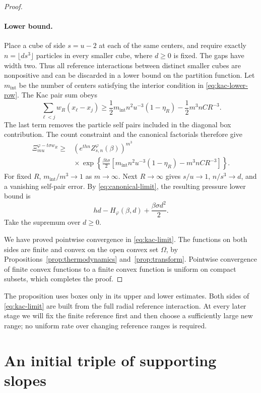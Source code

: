 \begin{proof}
\paragraph{Lower bound.}
Place a cube of side \(s=u-2\) at each of the same centers, and require
exactly \(n=\lfloor ds^3\rfloor\) particles in every smaller cube,
where \(d\ge0\) is fixed.  The gaps have width two.  Thus all reference
interactions between distinct smaller cubes are nonpositive and can be
discarded in a lower bound on the partition function.
Let \(m_{\mathrm{int}}\) be the number of centers satisfying the
interior condition in \eqref{eq:kac-lower-row}.  The Kac pair sum obeys
\[
 \sum_{\ell<j}w_R(x_\ell-x_j)
 \ge \frac12m_{\mathrm{int}}n^2u^{-3}(1-\eta_R)
                      -\frac12m^3nCR^{-3}.
\]
The last term removes the particle self pairs included in the diagonal
box contribution.  The count constraint and the canonical factorials
therefore give
\begin{align*}
 \Xi_{mu}^{\varphi-t\sigma w_R}
 \ge{}&
 \left(e^{thn}Z_{s,n}^{\varphi}(\beta)\right)^{m^3}\\
 &{}\times
 \exp\!\left\{\frac{\beta t\sigma}{2}
 \left[m_{\mathrm{int}}n^2u^{-3}(1-\eta_R)-m^3nCR^{-3}\right]\right\}.
\end{align*}
For fixed \(R\), \(m_{\mathrm{int}}/m^3\to1\) as \(m\to\infty\).
Next \(R\to\infty\) gives \(s/u\to1\), \(n/s^3\to d\), and a vanishing
self-pair error.  By \eqref{eq:canonical-limit}, the resulting pressure
lower bound is
\[
 hd-H_\varphi(\beta,d)+\frac{\beta\sigma d^2}{2}.
\]
Take the supremum over \(d\ge0\).

We have proved pointwise convergence in \eqref{eq:kac-limit}.
The functions on both sides are finite and convex on the open convex
set \(\Omega\), by Propositions~\ref{prop:thermodynamics}
and~\ref{prop:transform}.  Pointwise convergence of finite convex
functions to a finite convex function is uniform on compact subsets,
which completes the proof.
\end{proof}

The proposition uses boxes only in its upper and lower estimates.
Both sides of \eqref{eq:kac-limit} are built from the full radial
reference interaction.  At every later stage we will fix the finite
reference first and then choose a sufficiently large new range; no
uniform rate over changing reference ranges is required.

\section{An initial triple of supporting slopes}\label{sec:triple}


